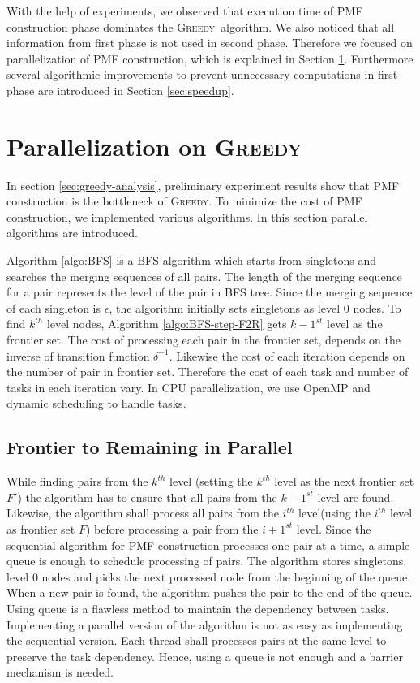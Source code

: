\documentclass[12pt]{article}
\newcommand{\comment}[2]{{\color{red}{\bf (#1: #2)}}}
\newcommand{\greedyAlgo}{\textsc{Greedy}}
\begin{document}
With the help of experiments, we observed that execution time of PMF construction phase dominates the \greedyAlgo\ algorithm. We also noticed that all information from first phase is not used in second phase. Therefore we focused on parallelization of PMF construction, which is explained in Section \ref{sec:parallel}. Furthermore several algorithmic improvements to prevent unnecessary computations in first phase are introduced in Section \ref{sec:speedup}.


\clearpage
\section{Parallelization on \greedyAlgo}
\label{sec:parallel}

In section \ref{sec:greedy-analysis}, preliminary experiment results show that PMF construction is the bottleneck of \greedyAlgo . To minimize the cost of PMF construction, we implemented various algorithms. In this section parallel algorithms are introduced.

Algorithm \ref{algo:BFS} is a BFS algorithm which starts from singletons and searches the merging sequences of all pairs. The length of the merging sequence for a pair represents the level of the pair in BFS tree. Since the merging sequence of each singleton is $\epsilon$, the algorithm initially sets singletons as level 0 nodes. To find $k^{th}$ level nodes, Algorithm \ref{algo:BFS-step-F2R} gets $k-1^{st}$ level as the frontier set. The cost of processing each pair in the frontier set, depends on the inverse of transition function $\delta^{-1}$. Likewise the cost of each iteration depends on the number of pair in frontier set. Therefore the cost of each task and number of tasks in each iteration vary. In CPU parallelization, we use OpenMP and dynamic scheduling to handle tasks. 

\comment{sertac}{BFS icin ornek figure cizilebilir}

\subsection{Frontier to Remaining in Parallel}
\label{sec:BFS-F2R-parallel}

While finding pairs from the $k^{th}$ level (setting the $k^{th}$ level as the next frontier set $F'$) the algorithm has to ensure that all pairs from the $k-1^{st}$ level are found. Likewise, the algorithm shall process all pairs from the $i^{th}$ level(using the $i^{th}$ level as frontier set $F$) before processing a pair from the $i+1^{st}$ level. Since the sequential algorithm for PMF construction processes one pair at a time, a simple queue is enough to schedule processing of pairs. The algorithm stores singletons, level 0 nodes and picks the next processed node from the beginning of the queue. When a new pair is found, the algorithm pushes the pair to the end of the queue. Using queue is a flawless method to maintain the dependency between tasks. Implementing a parallel version of the algorithm is not as easy as implementing the sequential version. Each thread shall processes pairs at the same level to preserve the task dependency. Hence, using a queue is not enough and a barrier mechanism is needed. 
\end{document}
